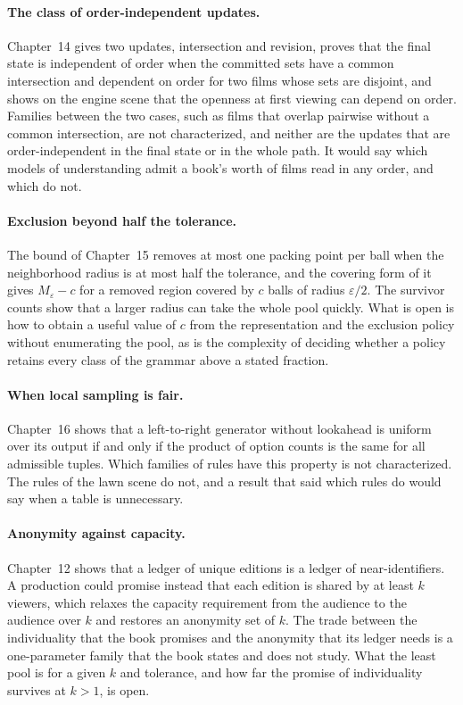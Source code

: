 \documentclass[11pt,twoside,openright]{book}
\theoremstyle{plain}
\theoremstyle{definition}
\theoremstyle{remark}
\begin{document}
\paragraph{The class of order-independent updates.} Chapter~14 gives two updates, intersection and revision, proves that the final state is independent of order when the committed sets have a common intersection and dependent on order for two films whose sets are disjoint, and shows on the engine scene that the openness at first viewing can depend on order. Families between the two cases, such as films that overlap pairwise without a common intersection, are not characterized, and neither are the updates that are order-independent in the final state or in the whole path. It would say which models of understanding admit a book's worth of films read in any order, and which do not.

\paragraph{Exclusion beyond half the tolerance.} The bound of Chapter~15 removes at most one packing point per ball when the neighborhood radius is at most half the tolerance, and the covering form of it gives $M_\varepsilon-c$ for a removed region covered by $c$ balls of radius $\varepsilon/2$. The survivor counts show that a larger radius can take the whole pool quickly. What is open is how to obtain a useful value of $c$ from the representation and the exclusion policy without enumerating the pool, as is the complexity of deciding whether a policy retains every class of the grammar above a stated fraction.

\paragraph{When local sampling is fair.} Chapter~16 shows that a left-to-right generator without lookahead is uniform over its output if and only if the product of option counts is the same for all admissible tuples. Which families of rules have this property is not characterized. The rules of the lawn scene do not, and a result that said which rules do would say when a table is unnecessary.

\paragraph{Anonymity against capacity.} Chapter~12 shows that a ledger of unique editions is a ledger of near-identifiers. A production could promise instead that each edition is shared by at least $k$ viewers, which relaxes the capacity requirement from the audience to the audience over $k$ and restores an anonymity set of $k$. The trade between the individuality that the book promises and the anonymity that its ledger needs is a one-parameter family that the book states and does not study. What the least pool is for a given $k$ and tolerance, and how far the promise of individuality survives at $k>1$, is open.
\end{document}

